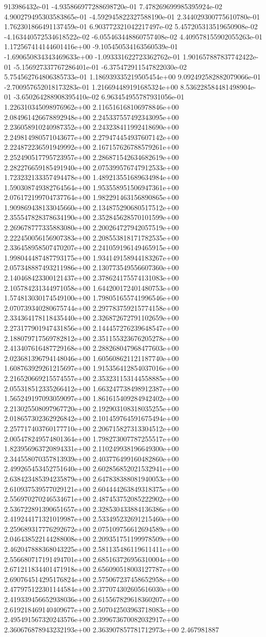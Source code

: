 913986432e-01	-4.935866977288698720e-01	7.478269699985395924e-02	4.900279495303583865e-01	-4.592945822327588190e-01	2.344029300775610780e-01	1.762301866491137459e-01	6.903772321042217497e-02	5.457205313519650908e-02	-4.163440572534618522e-02	-6.055463448860757408e-02	4.409578155902055263e-01	1.172567414144601416e+00	-9.105450534163560539e-01	-1.690650834343469633e+00	-1.093331622723362762e-01	1.901657887837742422e-01	-5.156927337767286401e-01	-6.375472911547822030e-02	5.754562764806385733e-01	1.186939335219505454e+00	9.092492582882079066e-01	-2.700957652018173283e-01	1.216694489191685324e+00	8.536228584481498904e-01	-3.650264288908395410e-02	6.963454955787931056e-01	1.226310345098976962e+00
2.116516168106978846e+00	2.084961426678892948e+00	2.245337557492343095e+00	2.236058910240987352e+00	2.243238411992418690e+00	2.249814980571043677e+00	2.279474454937607142e+00	2.224872236591949992e+00	2.167157626788579261e+00	2.252490517795723957e+00	2.286871542634682619e+00	2.282276659185491940e+00	2.075399576747912533e+00	1.723232133357494478e+00	1.489213551689634984e+00	1.590308749382764564e+00	1.953558951506947361e+00	2.076172199704737764e+00	1.982291463156890865e+00	1.909869438133045660e+00	2.134875290680517512e+00	2.355547828378634190e+00	2.352845628570101599e+00	2.269678777335883080e+00	2.200264727942057519e+00	2.222450056156907383e+00	2.208553818171782535e+00	2.336458958507470207e+00	2.241059196149465915e+00	1.998044487487793175e+00	1.934149158944183267e+00	2.057348887493211986e+00	2.130773549556607360e+00	2.140468423300121437e+00	2.378624175574131083e+00	2.105784231344971058e+00	1.644200172401480753e+00	1.574813030174549100e+00	1.798051655741996546e+00	2.070739340280675744e+00	2.297783759215774158e+00	2.334364178118435440e+00	2.326872672791102659e+00	2.273177901947431856e+00	2.144457276239648547e+00	2.188079717569782812e+00	2.351155323676205278e+00	2.413407616487729168e+00	2.288268047968477603e+00	2.023681396794148046e+00	1.605608621121187740e+00	1.608763929261215697e+00	1.915356412854037016e+00	2.216520669215574557e+00	2.353231153144558885e+00	2.055318512335266412e+00	1.663247738498912387e+00	1.565249197093059097e+00	1.861615409284942402e+00	2.213025508097967720e+00	2.192903108318035255e+00	2.018657302362926842e+00	2.101459764591675494e+00	2.257717403760177710e+00	2.206715827313304512e+00	2.005478249574801364e+00	1.798273007787255517e+00	1.823956963720894331e+00	2.110249938196649300e+00	2.344558070357813939e+00	2.403776499160482860e+00	2.499265453452751640e+00	2.602856852021532941e+00	2.638423485394235879e+00	2.647838388081940053e+00	2.610937539577029121e+00	2.604444263849318375e+00	2.556970270246534671e+00	2.487453752085222902e+00	2.536722891390651657e+00	2.328530433884136386e+00	2.419244171321019987e+00	2.533495232691215460e+00	2.259689317776292672e+00	2.075109756612694589e+00	2.046438522144288008e+00	2.209351751199978509e+00	2.462047888368043225e+00	2.581135486119611411e+00	2.556680717191494701e+00	2.685163726956310004e+00	2.671211834401471918e+00	2.656090518003127787e+00	2.690764514295176824e+00	2.575067237458652958e+00	2.477975122301144584e+00	2.377074302605616030e+00	2.419339456652938036e+00	2.615567829618360207e+00	2.619218469140409677e+00	2.507042503963718083e+00	2.495491567320243576e+00	2.399673670082032917e+00	2.360676878943232193e+00	2.363907857781712973e+00	2.467981887